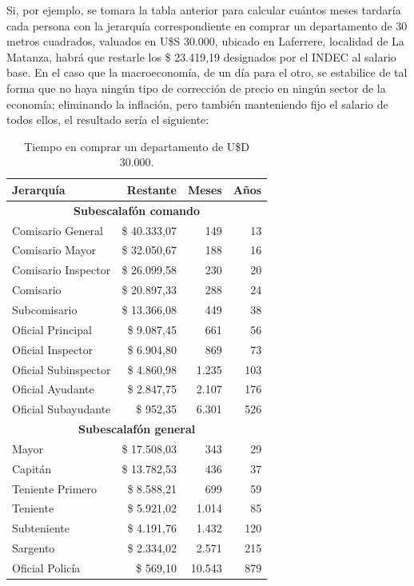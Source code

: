 \documentclass[12pt,a4paper,twoside]{book}
\begin{document}
Si, por ejemplo, se tomara la tabla anterior para calcular cuántos meses tardaría cada persona con la jerarquía correspondiente en comprar un departamento de 30 metros cuadrados, valuados en U\$S 30.000, ubicado en Laferrere, localidad de La Matanza, habrá que restarle los \$ 23.419,19 designados por el INDEC al salario base. En el caso que la macroeconomía, de un día para el otro, se estabilice de tal forma que no haya ningún tipo de corrección de precio en ningún sector de la economía; eliminando la inflación, pero también manteniendo fijo el salario de todos ellos, el resultado sería el siguiente:

\newpage

\begin{center}
\begin{longtable}{|l|r|r|r|}
\caption{Tiempo en comprar un departamento de U\$D 30.000.}
\label{tab:tabla-policia-ahorro} \\
\hline
\textbf{Jerarquía} & \textbf{Restante} & \textbf{Meses} & \textbf{Años} \\
\hline
\multicolumn{4}{|c|}{\textbf{Subescalafón comando}} \\
\hline
Comisario General & \$ 40.333,07 & 149 & 13 \\
\hline
Comisario Mayor & \$ 32.050,67 & 188 & 16 \\
\hline
Comisario Inspector & \$ 26.099,58 & 230 & 20 \\
\hline
Comisario & \$ 20.897,33 & 288 & 24 \\
\hline
Subcomisario & \$ 13.366,08 & 449 & 38 \\
\hline
Oficial Principal & \$ 9.087,45 & 661 & 56 \\
\hline
Oficial Inspector & \$ 6.904,80 & 869 & 73 \\
\hline
Oficial Subinspector & \$ 4.860,98 & 1.235 & 103 \\
\hline
Oficial Ayudante & \$ 2.847,75 & 2.107 & 176 \\
\hline
Oficial Subayudante & \$ 952,35 & 6.301 & 526 \\
\hline
\multicolumn{4}{|c|}{\textbf{Subescalafón general}} \\
\hline
Mayor & \$ 17.508,03 & 343 & 29 \\
\hline
Capitán & \$ 13.782,53 & 436 & 37 \\
\hline
Teniente Primero & \$ 8.588,21 & 699 & 59 \\
\hline
Teniente & \$ 5.921,02 & 1.014 & 85 \\
\hline
Subteniente & \$ 4.191,76 & 1.432 & 120 \\
\hline
Sargento & \$ 2.334,02 & 2.571 & 215 \\
\hline
Oficial Policía & \$ 569,10 & 10.543 & 879 \\
\hline
\end{longtable}
\end{center}
\end{document}
